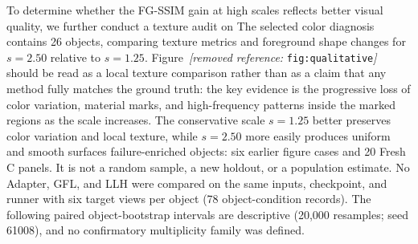 \documentclass[times,twocolumn,final]{elsarticle}
\providecommand{\DIFadd}[1]{{\protect\color{blue} \sf #1}} %
\providecommand{\DIFdel}[1]{{\protect\color{red} \scriptsize #1}} %
\providecommand{\DIFaddbegin}{} %
\providecommand{\DIFaddend}{} %
\providecommand{\DIFdelbegin}{} %
\providecommand{\DIFdelend}{} %
\begin{document}
\DIFdelbegin \DIFdel{To determine whether the FG-SSIM gain at high scales reflects better visual quality, we further conduct a texture audit on }\DIFdelend \DIFaddbegin \DIFadd{The selected color diagnosis contains }\DIFaddend 26 \DIFdelbegin \DIFdel{objects, comparing texture metrics and foreground shape changes for $s = 2.50$ relative to $s = 1.25$. Figure~\textit{[removed reference: }\texttt{fig:qualitative}\textit{]} should be read as a local texture comparison rather than as a claim that any method fully matches the ground truth: the key evidence is the progressive loss of color variation, material marks, and high-frequency patterns inside the marked regions as the scale increases. The conservative scale $s = 1.25$ better preserves color variation and local texture, while $s = 2.50$ more easily produces uniform and smooth surfaces}\DIFdelend \DIFaddbegin \DIFadd{failure-enriched objects: six earlier figure cases and 20 Fresh C panels. It is not a random sample, a new holdout, or a population estimate. No Adapter, GFL, and LLH were compared on the same inputs, checkpoint, and runner with six target views per object (78 object-condition records). The following paired object-bootstrap intervals are descriptive (20,000 resamples; seed 61008), and no confirmatory multiplicity family was defined}\DIFaddend .
\end{document}
